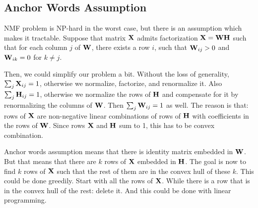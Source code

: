 \subsection{Anchor Words Assumption}

NMF problem is NP-hard in the worst case, but there is an assumption which makes it tractable. Suppose that matrix $\mathbf{X}$ admits factorization $\mathbf{X}=\mathbf{W}\mathbf{H}$ such that for each column $j$ of $\mathbf{W}$, there exists a row $i$, such that $\mathbf{W}_{ij}>0$ and $\mathbf{W}_{ik}=0$ for $k\neq j$.

Then, we could simplify our problem a bit. Without the loss of generality, $\sum_j\mathbf{X}_{ij}=1$, otherwise we normalize, factorize, and renormalize it. Also $\sum_j\mathbf{H}_{ij}=1$, otherwise we normalize the rows of $\mathbf{H}$ and compensate for it by renormalizing the columns of $\mathbf{W}$. Then $\sum_j\mathbf{W}_{ij}=1$ as well. The reason is that: rows of $\mathbf{X}$ are non-negative linear combinations of rows of $\mathbf{H}$ with coefficients in the rows of $\mathbf{W}$. Since rows $\mathbf{X}$ and $\mathbf{H}$ sum to 1, this has to be convex combination.

Anchor words assumption means that there is identity matrix embedded in $\mathbf{W}$. But that means that there are $k$ rows of $\mathbf{X}$ embedded in $\mathbf{H}$. The goal is now to find $k$ rows of $\mathbf{X}$ such that the rest of them are in the convex hull of these $k$. This could be done greedily. Start with all the rows of $\mathbf{X}$. While there is a row that is in the convex hull of the rest: delete it. And this could be done with linear programming.